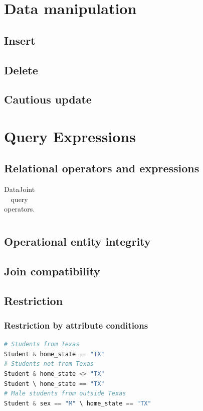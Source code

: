 \documentclass[letter,10pt]{article}
\begin{document}
\section{Data manipulation}\label{sec:manip}
\subsection{Insert}
\subsection{Delete}
\subsection{Cautious update}

\section{Query Expressions}\label{sec:query}
\subsection{Relational operators and expressions}
\begin{table}[ht]
\begin{tabu}{|X|}
\hline
\hline
\end{tabu}
\caption{DataJoint query operators.}
\label{tab:operators}
\end{table}

\subsection{Operational entity integrity}
\subsection{Join compatibility}
\subsection{Restriction}
\subsubsection{Restriction by attribute conditions}
\begin{lstlisting}[language=Python, caption={Restrictions by attribute conditions.}, label={lst:res1}]
# Students from Texas
Student & home_state == "TX"
# Students not from Texas
Student & home_state <> "TX"
Student \ home_state == "TX"
# Male students from outside Texas
Student & sex == "M" \ home_state == "TX"
\end{lstlisting}
\end{document}
